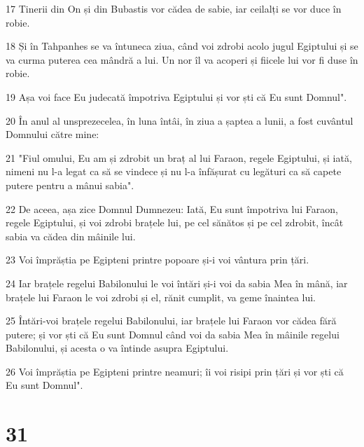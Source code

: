 \par 17 Tinerii din On și din Bubastis vor cădea de sabie, iar ceilalți se vor duce în robie.
\par 18 Și în Tahpanhes se va întuneca ziua, când voi zdrobi acolo jugul Egiptului și se va curma puterea cea mândră a lui. Un nor îl va acoperi și fiicele lui vor fi duse în robie.
\par 19 Așa voi face Eu judecată împotriva Egiptului și vor ști că Eu sunt Domnul".
\par 20 În anul al unsprezecelea, în luna întâi, în ziua a șaptea a lunii, a fost cuvântul Domnului către mine:
\par 21 "Fiul omului, Eu am și zdrobit un braț al lui Faraon, regele Egiptului, și iată, nimeni nu l-a legat ca să se vindece și nu l-a înfășurat cu legături ca să capete putere pentru a mânui sabia".
\par 22 De aceea, așa zice Domnul Dumnezeu: Iată, Eu sunt împotriva lui Faraon, regele Egiptului, și voi zdrobi brațele lui, pe cel sănătos și pe cel zdrobit, încât sabia va cădea din mâinile lui.
\par 23 Voi împrăștia pe Egipteni printre popoare și-i voi vântura prin țări.
\par 24 Iar brațele regelui Babilonului le voi întări și-i voi da sabia Mea în mână, iar brațele lui Faraon le voi zdrobi și el, rănit cumplit, va geme înaintea lui.
\par 25 Întări-voi brațele regelui Babilonului, iar brațele lui Faraon vor cădea fără putere; și vor ști că Eu sunt Domnul când voi da sabia Mea în mâinile regelui Babilonului, și acesta o va întinde asupra Egiptului.
\par 26 Voi împrăștia pe Egipteni printre neamuri; îi voi risipi prin țări și vor ști că Eu sunt Domnul".

\chapter{31}

